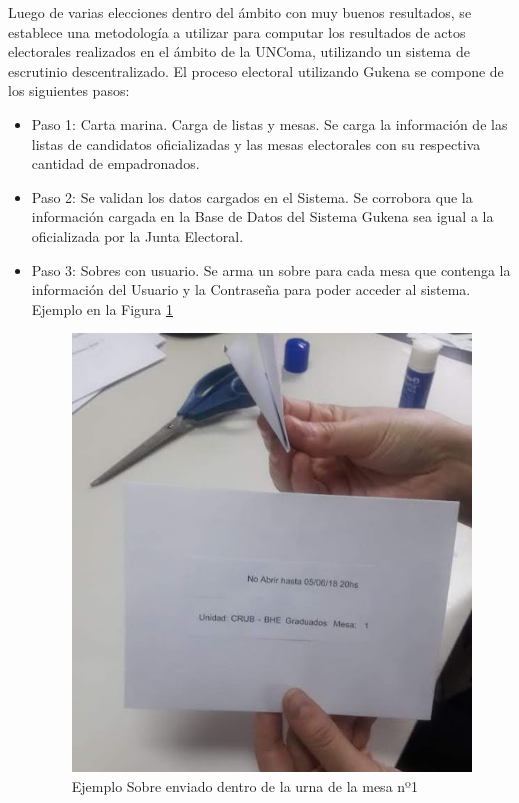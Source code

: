Luego de varias elecciones dentro del ámbito con muy buenos resultados, se establece una metodología a utilizar para computar los resultados de actos electorales realizados en el ámbito de la UNComa, utilizando un sistema de escrutinio descentralizado. \newline
El proceso electoral utilizando Gukena se compone de los siguientes pasos:
\begin{itemize}

\item Paso 1: Carta marina. Carga de listas y mesas. Se carga la información de las listas de candidatos oficializadas y las mesas electorales con su respectiva cantidad de empadronados.
\item Paso 2: Se validan los datos cargados en el Sistema. Se corrobora que la información cargada en la Base de Datos del Sistema Gukena sea igual a la oficializada por la Junta Electoral.
\item Paso 3: Sobres con usuario. Se arma un sobre para cada mesa que contenga la información del Usuario y la Contraseña para poder acceder al sistema. Ejemplo en la Figura \ref{graf:ejemploSobre}

\begin{figure}[h!]
    \begin{center}
        \includegraphics[scale=0.5]{img/jKz6EB2F9Z.png}
    \end{center}
  \caption{Ejemplo Sobre enviado dentro de la urna de la mesa nº1}
  \label{graf:ejemploSobre}
\end{figure}


\end{itemize}
